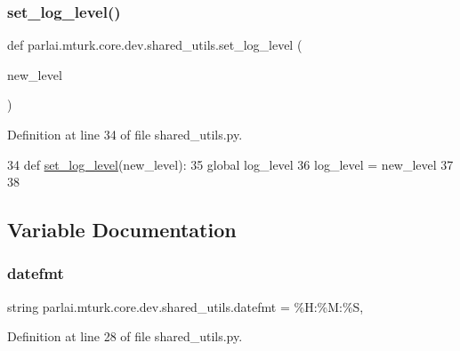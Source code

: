 \subsubsection{\texorpdfstring{set\+\_\+log\+\_\+level()}{set\_log\_level()}}
{\footnotesize\ttfamily def parlai.\+mturk.\+core.\+dev.\+shared\+\_\+utils.\+set\+\_\+log\+\_\+level (\begin{DoxyParamCaption}\item[{}]{new\+\_\+level }\end{DoxyParamCaption})}



Definition at line 34 of file shared\+\_\+utils.\+py.


\begin{DoxyCode}
34 \textcolor{keyword}{def }\hyperlink{namespaceparlai_1_1mturk_1_1core_1_1shared__utils_ac8a4f9a9107ed8eca14da5117922fbee}{set\_log\_level}(new\_level):
35     \textcolor{keyword}{global} log\_level
36     log\_level = new\_level
37 
38 
\end{DoxyCode}


\subsection{Variable Documentation}
\mbox{\label{namespaceparlai_1_1mturk_1_1core_1_1dev_1_1shared__utils_a1c68d8689338d1770e2f7553d1d192a6}} 
\subsubsection{\texorpdfstring{datefmt}{datefmt}}
{\footnotesize\ttfamily string parlai.\+mturk.\+core.\+dev.\+shared\+\_\+utils.\+datefmt = \textquotesingle{}\%H\+:\%M\+:\%S\textquotesingle{},}



Definition at line 28 of file shared\+\_\+utils.\+py.

\mbox{\label{namespaceparlai_1_1mturk_1_1core_1_1dev_1_1shared__utils_a34057453b7480c688a7b07dae765b56b}} 
